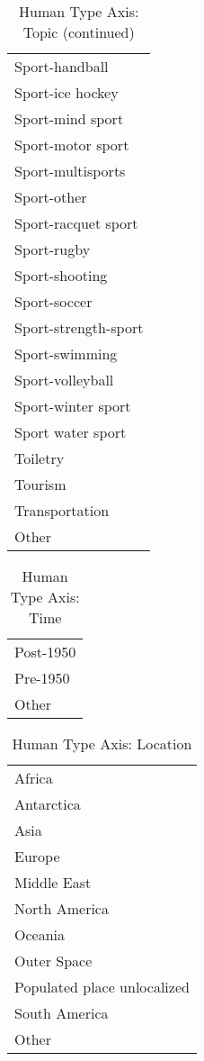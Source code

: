 \documentclass[letterpaper]{article}
\begin{document}
\begin{table*}[ht]
\caption{Human Type Axis: Topic (continued)}
\begin{center}
\begin{tabular}{|l|}\hline
Sport-handball\\
Sport-ice hockey\\
Sport-mind sport\\
Sport-motor sport\\
Sport-multisports\\
Sport-other\\
Sport-racquet sport\\
Sport-rugby\\
Sport-shooting\\
Sport-soccer\\
Sport-strength-sport\\
Sport-swimming\\
Sport-volleyball\\
Sport-winter sport\\
Sport water sport\\
Toiletry\\
Tourism\\
Transportation\\
Other\\
\hline
\end{tabular}
\end{center}
\label{table:}
\end{table*}\begin{table*}[ht]

\caption{Human Type Axis: Time}
\begin{center}
\begin{tabular}{|l|}\hline
Post-1950\\
Pre-1950\\
Other\\
\hline
\end{tabular}
\end{center}
\label{table}

\end{table*}
\begin{table*}[ht]
\caption{Human Type Axis: Location}
\begin{center}
\begin{tabular}{|l|}\hline
Africa\\
Antarctica\\
Asia\\
Europe\\
Middle East\\
North America\\
Oceania\\
Outer Space\\
Populated place unlocalized\\
South America\\
Other\\
\hline
\end{tabular}
\end{center}
\label{table:}
\end{table*}



\end{document}
